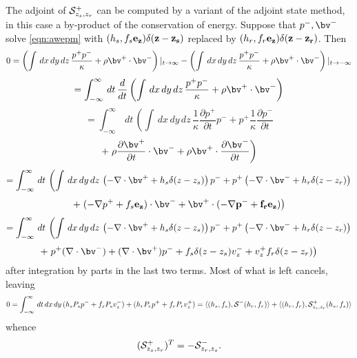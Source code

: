 

\newpage


The adjoint of ${\cal S}^+_{z_s,z_r}$ can be computed by a variant of
the adjoint state method, in this case a by-product of the
conservation of energy. Suppose that $p^-,\bv^-$ solve \ref{eqn:awepm}
with $(h_s,f_s\bf{e}_z)\delta(z-z_s)$ replaced by
$ (h_r,f_r\bf{e}_z) \delta(z-z_r)$. Then
\[
0 = 
\left(\int\, dx\,dy\,dz\, \frac{p^+ p^-}{\kappa} +  
\rho \bv^+ \cdot \bv^- \right)|_{t \rightarrow \infty}
-
\left(\int\, dx\,dy\,dz\, \frac{p^+ p^-}{\kappa} +  \rho \bv^+ \cdot \bv^- \right)|_{t \rightarrow -\infty}
\]
\[
= 
\int_{-\infty}^{\infty} \,dt\, \frac{d}{dt}\left(\int\, dx\,dy\,dz\, \frac{p^+ p^-}{\kappa} +  \rho \bv^+ \cdot \bv^- \right)
\]
\[
= 
\int_{-\infty}^{\infty} \,dt\, \left(\int\, dx\,dy\,dz\, \frac{1}{\kappa} \frac{\partial p^+}{\partial t} p^- +  p^+ \frac{1}{\kappa}\frac{\partial p^-}{\partial t} \right.
\]
\[
+
\left. \rho \frac{\partial \bv^+}{\partial t} \cdot \bv^- + \rho \bv^+ \cdot \frac{\partial \bv^-}{\partial t} \right)
\]
\[
= 
\int_{-\infty}^{\infty} \,dt\, \left(\int\, dx\,dy\,dz\, \left(- \nabla \cdot \bv^+ + 
 h_s \delta(z-z_s)\right) p^- + p^+ \left(- \nabla \cdot \bv^- + 
 h_r \delta(z-z_r)\right) \right.
\]
\[
+
\left.  (- \nabla p^++f_s\bf{e}_z) \cdot \bv^- + \bv^+ \cdot (-\nabla
  p^- + f_r \bf{e_z}) \right)
\]
\[
= 
\int_{-\infty}^{\infty}\,dt\, \left(\int\, dx\,dy\,dz\, \left(- \nabla \cdot \bv^+ + 
 h_s \delta(z-z_s)\right) p^- + p^+ \left(- \nabla \cdot \bv^- + 
 h_r \delta(z-z_r)\right) \right.
\]
\[
+
\left.  p^+ (\nabla \cdot \bv^-) + (\nabla \cdot \bv^+) p^- 
  +f_s \delta(z-z_s) v_z^- + v_z^+f_r \delta(z-z_r) \right)
\]
after integration by parts in the last two terms. Most of what is left cancels, leaving 
\[
0 = \int_{-\infty}^{\infty}\,dt\,dx\,dy\, (h_sP_sp^-+f_zP_sv_z^-) +
( h_rP_rp^++f_rP_rv_z^+) = \langle (h_s,f_s), {\cal S}^-(h_r,f_r) \rangle+ \langle (h_r,f_r), {\cal S}^+_{z_s,z_r}(h_s,f_s) \rangle
\]
whence
\begin{equation}
\label{eqn:sadj}
 ({\cal S}^+_{z_s,z_r})^T = -{\cal S}^{-}_{z_r,z_s}.
\end{equation}

